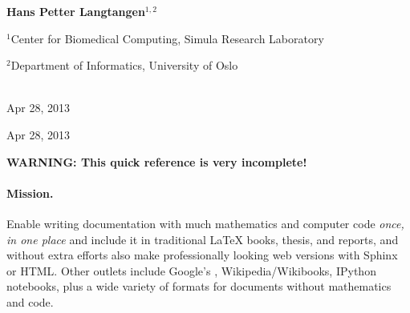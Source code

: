 \documentclass[%
oneside,                 %
final,                   %
10pt]{article}
\begin{document}
\begin{center}

\begin{center}
{\bf Hans Petter Langtangen${}^{1, 2}$} \\ [0mm]
\end{center}

\begin{center}
\centerline{{\small ${}^1$Center for Biomedical Computing, Simula Research Laboratory}}
\centerline{{\small ${}^2$Department of Informatics, University of Oslo}}
\end{center}




\date{Apr 28, 2013}
\maketitle


\ \\ [10mm]
{\large\textsf{Apr 28, 2013}}

\end{center}
\vfill
\clearpage


\begin{center}
Apr 28, 2013
\end{center}

\vspace{1cm}



\tableofcontents

\vspace{1cm} %





\textbf{WARNING: This quick reference is very incomplete!}

\paragraph{Mission.}
Enable writing documentation with much mathematics and
computer code \emph{once, in one place} and include it in traditional {\LaTeX}
books, thesis, and reports, and without extra efforts also make
professionally looking web versions with Sphinx or HTML. Other outlets
include Google's , Wikipedia/Wikibooks, IPython
notebooks, plus a wide variety of formats for documents without
mathematics and code.
\end{document}

